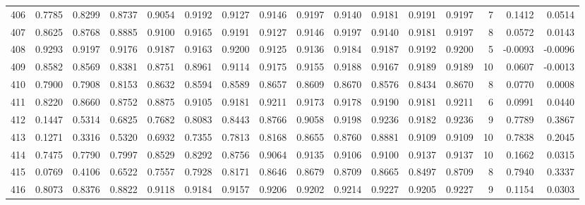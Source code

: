 \begin{tabular}{lrrrrrrrrrrrrrrr}
406 &      0.7785 &  0.8299 &  0.8737 &  0.9054 &  0.9192 &  0.9127 &  0.9146 &  0.9197 &  0.9140 &  0.9181 &   0.9191 &     0.9197 &      7 &                    0.1412 &                     0.0514 \\
407 &      0.8625 &  0.8768 &  0.8885 &  0.9100 &  0.9165 &  0.9191 &  0.9127 &  0.9146 &  0.9197 &  0.9140 &   0.9181 &     0.9197 &      8 &                    0.0572 &                     0.0143 \\
408 &      0.9293 &  0.9197 &  0.9176 &  0.9187 &  0.9163 &  0.9200 &  0.9125 &  0.9136 &  0.9184 &  0.9187 &   0.9192 &     0.9200 &      5 &                   -0.0093 &                    -0.0096 \\
409 &      0.8582 &  0.8569 &  0.8381 &  0.8751 &  0.8961 &  0.9114 &  0.9175 &  0.9155 &  0.9188 &  0.9167 &   0.9189 &     0.9189 &     10 &                    0.0607 &                    -0.0013 \\
410 &      0.7900 &  0.7908 &  0.8153 &  0.8632 &  0.8594 &  0.8589 &  0.8657 &  0.8609 &  0.8670 &  0.8576 &   0.8434 &     0.8670 &      8 &                    0.0770 &                     0.0008 \\
411 &      0.8220 &  0.8660 &  0.8752 &  0.8875 &  0.9105 &  0.9181 &  0.9211 &  0.9173 &  0.9178 &  0.9190 &   0.9181 &     0.9211 &      6 &                    0.0991 &                     0.0440 \\
412 &      0.1447 &  0.5314 &  0.6825 &  0.7682 &  0.8083 &  0.8443 &  0.8766 &  0.9058 &  0.9198 &  0.9236 &   0.9182 &     0.9236 &      9 &                    0.7789 &                     0.3867 \\
413 &      0.1271 &  0.3316 &  0.5320 &  0.6932 &  0.7355 &  0.7813 &  0.8168 &  0.8655 &  0.8760 &  0.8881 &   0.9109 &     0.9109 &     10 &                    0.7838 &                     0.2045 \\
414 &      0.7475 &  0.7790 &  0.7997 &  0.8529 &  0.8292 &  0.8756 &  0.9064 &  0.9135 &  0.9106 &  0.9100 &   0.9137 &     0.9137 &     10 &                    0.1662 &                     0.0315 \\
415 &      0.0769 &  0.4106 &  0.6522 &  0.7557 &  0.7928 &  0.8171 &  0.8646 &  0.8679 &  0.8709 &  0.8665 &   0.8497 &     0.8709 &      8 &                    0.7940 &                     0.3337 \\
416 &      0.8073 &  0.8376 &  0.8822 &  0.9118 &  0.9184 &  0.9157 &  0.9206 &  0.9202 &  0.9214 &  0.9227 &   0.9205 &     0.9227 &      9 &                    0.1154 &                     0.0303 \\

\end{tabular}
